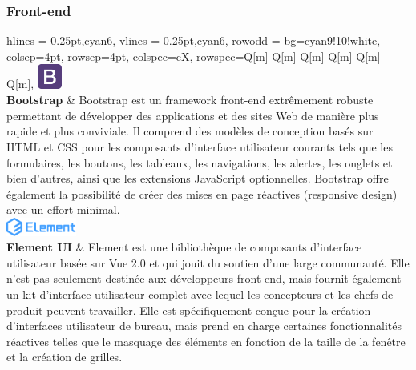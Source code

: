 \subsubsection{Front-end}
\begin{longtblr}[caption={Technologies utilisées au niveau du front-end}]{
    hlines = {0.25pt,cyan6},
    vlines = {0.25pt,cyan6},
    row{odd} = {bg=cyan9!10!white},
    colsep=4pt,
    rowsep=4pt,
	colspec={cX},
    rowspec={Q[m] Q[m] Q[m] Q[m] Q[m] Q[m]},
}
{
\includegraphics[height=8mm]{images/sec5/bootstrap.pdf}
\\\textbf{Bootstrap}
}
& 
Bootstrap est un framework front-end extrêmement robuste permettant de développer des applications et des sites Web de manière plus rapide et plus conviviale. Il comprend des modèles de conception basés sur HTML et CSS pour les composants d'interface utilisateur courants tels que les formulaires, les boutons, les tableaux, les navigations, les alertes, les onglets et bien d'autres, ainsi que les extensions JavaScript optionnelles.
Bootstrap offre également la possibilité de créer des mises en page réactives (responsive design) avec un effort minimal.\\

{
\includegraphics[height=6mm]{images/sec5/elementui.pdf}\\\textbf{Element UI}
}
& 
Element est une bibliothèque de composants d'interface utilisateur basée sur Vue 2.0 et qui jouit du soutien d'une large communauté. Elle n'est pas seulement destinée aux développeurs front-end, mais fournit également un kit d'interface utilisateur complet avec lequel les concepteurs et les chefs de produit peuvent travailler. Elle est spécifiquement conçue pour la création d'interfaces utilisateur de bureau, mais prend en charge certaines fonctionnalités réactives telles que le masquage des éléments en fonction de la taille de la fenêtre et la création de grilles.
\\


\end{longtblr}
